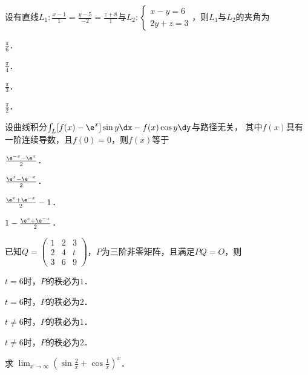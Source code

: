 \documentclass[plain,noanswer,medmath]{../../template/jnuexam}
\begin{document}
\begin{problem}
设有直线$L_1:\frac{x - 1}{1} = \frac{y - 5}{-2} = \frac{z + 8}{1}$与$L_2:\begin{cases}
  x - y = 6 \\
  2y + z = 3
\end{cases}$，则$L_1$与$L_2$的夹角为\pickout{}
\begin{abcd}
\item $\frac{\pi}{6}$．        
\item $\frac{\pi}{4}$．        
\item $\frac{\pi}{3}$．        
\item $\frac{\pi}{2}$．
\end{abcd}
\end{problem}


\begin{problem}
设曲线积分$\int_L [f(x) - \e^x]\sin y\dx - f(x)\cos y\dy$与路径无关，
其中$f(x)$具有一阶连续导数，且$f(0) = 0$，则$f(x)$等于\pickout{}
\begin{abcd}
\item $\frac{\e^{- x} - \e^x}{2}$．   
\item $\frac{\e^x - \e^{-x}}{2}$．   
\item $\frac{\e^x + \e^{-x}}{2} - 1$．   
\item $1-\frac{\e^x + \e^{-x}}{2}$．
\end{abcd}
\end{problem}


\begin{problem}
已知$Q = \begin{pmatrix}
  1 & 2 & 3 \\
  2 & 4 & t \\
  3 & 6 & 9
\end{pmatrix}$，$P$为三阶非零矩阵，且满足$PQ = O$，则
\begin{abcd}
\item $t = 6$时，$P$的秩必为$1$．
\item $t = 6$时，$P$的秩必为$2$．
\item $t \ne 6$时，$P$的秩必为$1$．
\item $t \ne 6$时，$P$的秩必为$2$．
\end{abcd}
\end{problem}




\begin{problem}
求 $\lim_{x \to \infty} \left(\sin \frac{2}{x} + \cos \frac{1}{x} \right)^x$．
\end{problem}
\end{document}
